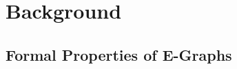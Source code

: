 \section{Background}\label{sec:background}


\subsection{Formal Properties of E-Graphs}\label{sec:background:egraph}
